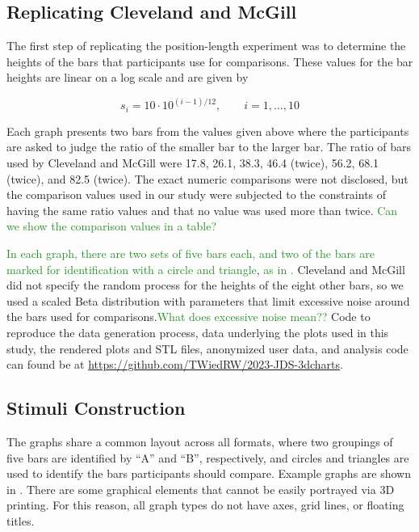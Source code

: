 \documentclass[letterpaper,inpress,dvipsnames]{jdsart}
\begin{document}
\hypertarget{replicating-cleveland-and-mcgill}{%
\subsection{Replicating Cleveland and McGill}\label{replicating-cleveland-and-mcgill}}

The first step of replicating the position-length experiment was to determine the heights of the bars that participants use for comparisons.
These values for the bar heights are linear on a log scale and are given by

\[s_i=10\cdot 10^{(i-1)/12}, \qquad i=1,...,10\]

Each graph presents two bars from the values given above where the participants are asked to judge the ratio of the smaller bar to the larger bar. The ratio of bars used by Cleveland and McGill were 17.8, 26.1, 38.3, 46.4 (twice), 56.2, 68.1 (twice), and 82.5 (twice).
The exact numeric comparisons were not disclosed, but the comparison values used in our study were subjected to the constraints of having the same ratio values and that no value was used more than twice. {\textcolor{ForestGreen}{Can we show the comparison values in a table?}}

{\textcolor{ForestGreen}{In each graph, there are two sets of five bars each, and two of the bars are marked for identification with a circle and triangle}}, {\textcolor{ForestGreen}{as in .}}
Cleveland and McGill did not specify the random process for the heights of the eight other bars, so we used a scaled Beta distribution with parameters that limit excessive noise around the bars used for comparisons.{\textcolor{ForestGreen}{What does excessive noise mean??}}
Code to reproduce the data generation process, data underlying the plots used in this study, the rendered plots and STL files, anonymized user data, and analysis code can found be at \url{https://github.com/TWiedRW/2023-JDS-3dcharts}.

\hypertarget{stimuli-construction}{%
\subsection{Stimuli Construction}\label{stimuli-construction}}

The graphs share a common layout across all formats, where two groupings of five bars are identified by ``A'' and ``B'', respectively, and circles and triangles are used to identify the bars participants should compare. Example graphs are shown in
.
There are some graphical elements that cannot be easily portrayed via 3D printing. For this reason, all graph types do not have axes, grid lines, or floating titles.
\end{document}
